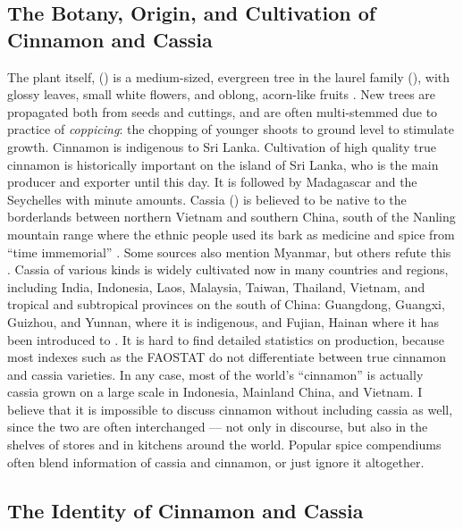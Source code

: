 \subsection{The Botany, Origin, and Cultivation of Cinnamon and Cassia}

The plant itself, () is a medium-sized, evergreen tree in the laurel family (), with glossy leaves, small white flowers, and oblong, acorn-like fruits \parencite[104]{van_wyk_culinary_2014}. New trees are propagated both from seeds and cuttings, and are often multi-stemmed due to practice of \textit{coppicing}: the chopping of younger shoots to ground level to stimulate growth. Cinnamon is indigenous to Sri Lanka. Cultivation of high quality true cinnamon is historically important on the island of Sri Lanka, who is the main producer and exporter until this day. It is followed by Madagascar and the Seychelles with minute amounts. Cassia () is believed to be native to the borderlands between northern Vietnam and southern China, south of the Nanling mountain range where the ethnic people used its bark as medicine and spice from ``time immemorial'' \parencite[400]{hu_food_2005}. Some sources also mention Myanmar, but others refute this \parencite[see][]{haw_cinnamon_2017}. Cassia of various kinds is widely cultivated now in many countries and regions, including India, Indonesia, Laos, Malaysia, Taiwan, Thailand, Vietnam, and tropical and subtropical provinces on the south of China: Guangdong, Guangxi, Guizhou, and Yunnan, where it is indigenous, and Fujian, Hainan where it has been introduced to \parencite{ford_cinnamon_2019, chennault_reclusive_2006}. It is hard to find detailed statistics on production, because most indexes such as the \gls{FAOSTAT} do not differentiate between true cinnamon and cassia varieties. In any case, most of the world's ``cinnamon'' is actually cassia grown on a large scale in Indonesia, Mainland China, and Vietnam. I believe that it is impossible to discuss cinnamon without including cassia as well, since the two are often interchanged --- not only in discourse, but also in the shelves of stores and in kitchens around the world. Popular spice compendiums often blend information of cassia and cinnamon, or just ignore it altogether.

\subsection{The Identity of Cinnamon and Cassia}
\label{sec:identity_cinnamon}


